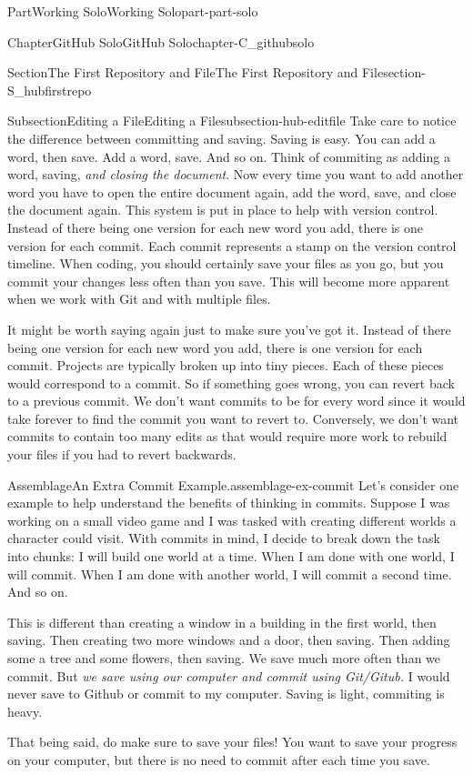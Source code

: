 \documentclass[oneside,10pt,]{book}
\begin{document}
\begin{partptx}{Part}{Working Solo}{}{Working Solo}{}{}{part-part-solo}
\begin{chapterptx}{Chapter}{GitHub Solo}{}{GitHub Solo}{}{}{chapter-C_githubsolo}
\begin{sectionptx}{Section}{The First Repository and File}{}{The First Repository and File}{}{}{section-S_hubfirstrepo}
\begin{subsectionptx}{Subsection}{Editing a File}{}{Editing a File}{}{}{subsection-hub-editfile}
Take care to notice the difference between committing and saving. Saving is easy. You can add a word, then save. Add a word, save. And so on. Think of commiting as adding a word, saving, \emph{and closing the document}. Now every time you want to add another word you have to open the entire document again, add the word, save, and close the document again. This system is put in place to help with version control. Instead of there being one version for each new word you add, there is one version for each commit. Each commit represents a stamp on the version control timeline. When coding, you should certainly save your files as you go, but you commit your changes less often than you save. This will become more apparent when we work with Git and with multiple files.%
\par
It might be worth saying again just to make sure you've got it. Instead of there being one version for each new word you add, there is one version for each commit. Projects are typically broken up into tiny pieces. Each of these pieces would correspond to a commit. So if something goes wrong, you can revert back to a previous commit. We don't want commits to be for every word since it would take forever to find the commit you want to revert to. Conversely, we don't want commits to contain too many edits as that would require more work to rebuild your files if you had to revert backwards.%
\begin{assemblage}{Assemblage}{An Extra Commit Example.}{assemblage-ex-commit}%
Let's consider one example to help understand the benefits of thinking in commits. Suppose I was working on a small video game and I was tasked with creating different worlds a character could visit. With commits in mind, I decide to break down the task into chunks: I will build one world at a time. When I am done with one world, I will commit. When I am done with another world, I will commit a second time. And so on.%
\par
This is different than creating a window in a building in the first world, then saving. Then creating two more windows and a door, then saving. Then adding some a tree and some flowers, then saving. We save much more often than we commit. But \emph{we save using our computer and commit using Git\slash{}Gitub.} I would never save to Github or commit to my computer. Saving is light, commiting is heavy.%
\par
That being said, do make sure to save your files! You want to save your progress on your computer, but there is no need to commit after each time you save.%

\end{assemblage}
\end{subsectionptx}
\end{sectionptx}
\end{chapterptx}
\end{partptx}
\end{document}
